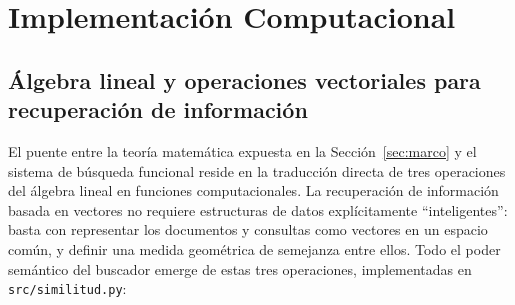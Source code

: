 
\section{Implementación Computacional}

\subsection{Álgebra lineal y operaciones vectoriales para recuperación de información}

El puente entre la teoría matemática expuesta en la Sección~\ref{sec:marco} y el sistema de búsqueda funcional reside en la traducción directa de tres operaciones del álgebra lineal en funciones computacionales. La recuperación de información basada en vectores no requiere estructuras de datos explícitamente ``inteligentes'': basta con representar los documentos y consultas como vectores en un espacio común, y definir una medida geométrica de semejanza entre ellos. Todo el poder semántico del buscador emerge de estas tres operaciones, implementadas en \texttt{src/similitud.py}:

